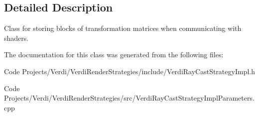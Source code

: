 \subsection{\-Detailed \-Description}
\-Class for storing blocks of transformation matrices when communicating with shaders. 

\-The documentation for this class was generated from the following files\-:\begin{DoxyCompactItemize}
\item 
\-Code Projects/\-Verdi/\-Verdi\-Render\-Strategies/include/\-Verdi\-Ray\-Cast\-Strategy\-Impl.\-h\item 
\-Code Projects/\-Verdi/\-Verdi\-Render\-Strategies/src/\-Verdi\-Ray\-Cast\-Strategy\-Impl\-Parameters.\-cpp\end{DoxyCompactItemize}
